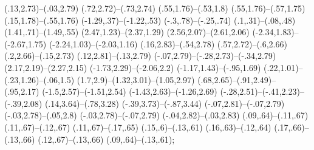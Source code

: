 {(.13,2.73)--(.03,2.79) (.72,2.72)--(.73,2.74) (.55,1.76)--(.53,1.8) (.55,1.76)--(.57,1.75) (.15,1.78)--(.55,1.76) (-1.29,.37)--(-1.22,.53) (-.3,.78)--(-.25,.74) (.1,.31)--(.08,.48) (1.41,.71)--(1.49,.55) (2.47,1.23)--(2.37,1.29) (2.56,2.07)--(2.61,2.06) (-2.34,1.83)--(-2.67,1.75) (-2.24,1.03)--(-2.03,1.16) (.16,2.83)--(.54,2.78) (.57,2.72)--(.6,2.66) (.2,2.66)--(.15,2.73) (.12,2.81)--(.13,2.79) (-.07,2.79)--(-.28,2.73)--(-.34,2.79) (2.17,2.19)--(2.27,2.15) (-1.73,2.29)--(-2.06,2.2) (-1.17,1.43)--(-.95,1.69) (.22,1.01)--(.23,1.26)--(.06,1.5) (1.7,2.9)--(1.32,3.01)--(1.05,2.97) (.68,2.65)--(.91,2.49)--(.95,2.17) (-1.5,2.57)--(-1.51,2.54) (-1.43,2.63)--(-1.26,2.69) (-.28,2.51)--(-.41,2.23)--(-.39,2.08) (.14,3.64)--(.78,3.28) (-.39,3.73)--(-.87,3.44) (-.07,2.81)--(-.07,2.79) (-.03,2.78)--(.05,2.8) (-.03,2.78)--(-.07,2.79) (-.04,2.82)--(.03,2.83) (.09,.64)--(.11,.67) (.11,.67)--(.12,.67) (.11,.67)--(.17,.65) (.15,.6)--(.13,.61) (.16,.63)--(.12,.64) (.17,.66)--(.13,.66) (.12,.67)--(.13,.66) (.09,.64)--(.13,.61);}
